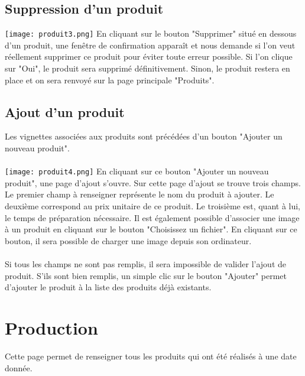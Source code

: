 \subsection{Suppression d'un produit}
\texttt{[image: produit3.png]}
En cliquant sur le bouton "Supprimer" situé en dessous d'un produit, une 
fenêtre de confirmation apparaît et nous demande si l'on veut réellement supprimer 
ce produit pour éviter toute erreur possible. Si l'on clique sur "Oui", le 
produit sera supprimé définitivement. Sinon, le produit restera en place et on 
sera renvoyé sur la page principale "Produits".


\subsection{Ajout d'un produit}
Les vignettes associées aux produits sont précédées d'un bouton "Ajouter un 
nouveau produit".

\paragraph{}
\texttt{[image: produit4.png]}
En cliquant sur ce bouton "Ajouter un nouveau produit", une page d'ajout s'ouvre.
Sur cette page d'ajout se trouve trois champs. Le premier champ à renseigner 
représente le nom du produit à ajouter. Le deuxième correspond au prix unitaire 
de ce produit. Le troisième est, quant à lui, le temps de préparation nécessaire.
Il est également possible d'associer une image à un produit en cliquant sur le 
bouton "Choisissez un fichier". En cliquant sur ce bouton, il sera possible de 
charger une image depuis son ordinateur.

\paragraph{}
Si tous les champs ne sont pas remplis, il sera impossible de valider l'ajout de 
produit. S'ils sont bien remplis, un simple clic sur le bouton "Ajouter" 
permet d'ajouter le produit à la liste des produits déjà existants. 



\section{Production}
Cette page permet de renseigner tous les produits qui ont été réalisés à une date 
donnée.

